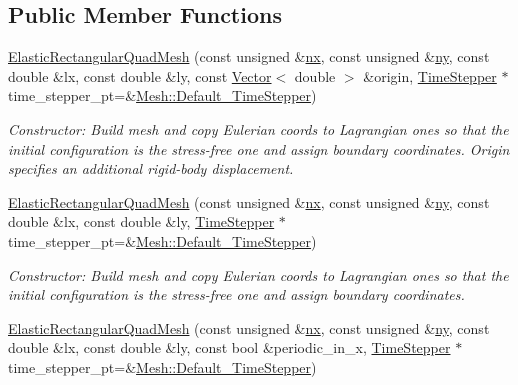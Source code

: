\subsection*{Public Member Functions}
\begin{DoxyCompactItemize}
\item 
\hyperlink{classoomph_1_1ElasticRectangularQuadMesh_aad1e395c3f314854b68c4f1df9256230}{Elastic\+Rectangular\+Quad\+Mesh} (const unsigned \&\hyperlink{classoomph_1_1RectangularQuadMesh_abfef93d6322886cdce14a437186e4821}{nx}, const unsigned \&\hyperlink{classoomph_1_1RectangularQuadMesh_a86d76a55eb7c4e8bca9b74d23c8b0412}{ny}, const double \&lx, const double \&ly, const \hyperlink{classoomph_1_1Vector}{Vector}$<$ double $>$ \&origin, \hyperlink{classoomph_1_1TimeStepper}{Time\+Stepper} $\ast$time\+\_\+stepper\+\_\+pt=\&\hyperlink{classoomph_1_1Mesh_a12243d0fee2b1fcee729ee5a4777ea10}{Mesh\+::\+Default\+\_\+\+Time\+Stepper})
\begin{DoxyCompactList}\small\item\em Constructor\+: Build mesh and copy Eulerian coords to Lagrangian ones so that the initial configuration is the stress-\/free one and assign boundary coordinates. Origin specifies an additional rigid-\/body displacement. \end{DoxyCompactList}\item 
\hyperlink{classoomph_1_1ElasticRectangularQuadMesh_a57b701739dcc5c643a1a9bae94a4b7d8}{Elastic\+Rectangular\+Quad\+Mesh} (const unsigned \&\hyperlink{classoomph_1_1RectangularQuadMesh_abfef93d6322886cdce14a437186e4821}{nx}, const unsigned \&\hyperlink{classoomph_1_1RectangularQuadMesh_a86d76a55eb7c4e8bca9b74d23c8b0412}{ny}, const double \&lx, const double \&ly, \hyperlink{classoomph_1_1TimeStepper}{Time\+Stepper} $\ast$time\+\_\+stepper\+\_\+pt=\&\hyperlink{classoomph_1_1Mesh_a12243d0fee2b1fcee729ee5a4777ea10}{Mesh\+::\+Default\+\_\+\+Time\+Stepper})
\begin{DoxyCompactList}\small\item\em Constructor\+: Build mesh and copy Eulerian coords to Lagrangian ones so that the initial configuration is the stress-\/free one and assign boundary coordinates. \end{DoxyCompactList}\item 
\hyperlink{classoomph_1_1ElasticRectangularQuadMesh_a3865acefe6df1aac212d8306f516ebd1}{Elastic\+Rectangular\+Quad\+Mesh} (const unsigned \&\hyperlink{classoomph_1_1RectangularQuadMesh_abfef93d6322886cdce14a437186e4821}{nx}, const unsigned \&\hyperlink{classoomph_1_1RectangularQuadMesh_a86d76a55eb7c4e8bca9b74d23c8b0412}{ny}, const double \&lx, const double \&ly, const bool \&periodic\+\_\+in\+\_\+x, \hyperlink{classoomph_1_1TimeStepper}{Time\+Stepper} $\ast$time\+\_\+stepper\+\_\+pt=\&\hyperlink{classoomph_1_1Mesh_a12243d0fee2b1fcee729ee5a4777ea10}{Mesh\+::\+Default\+\_\+\+Time\+Stepper})

\end{DoxyCompactItemize}
